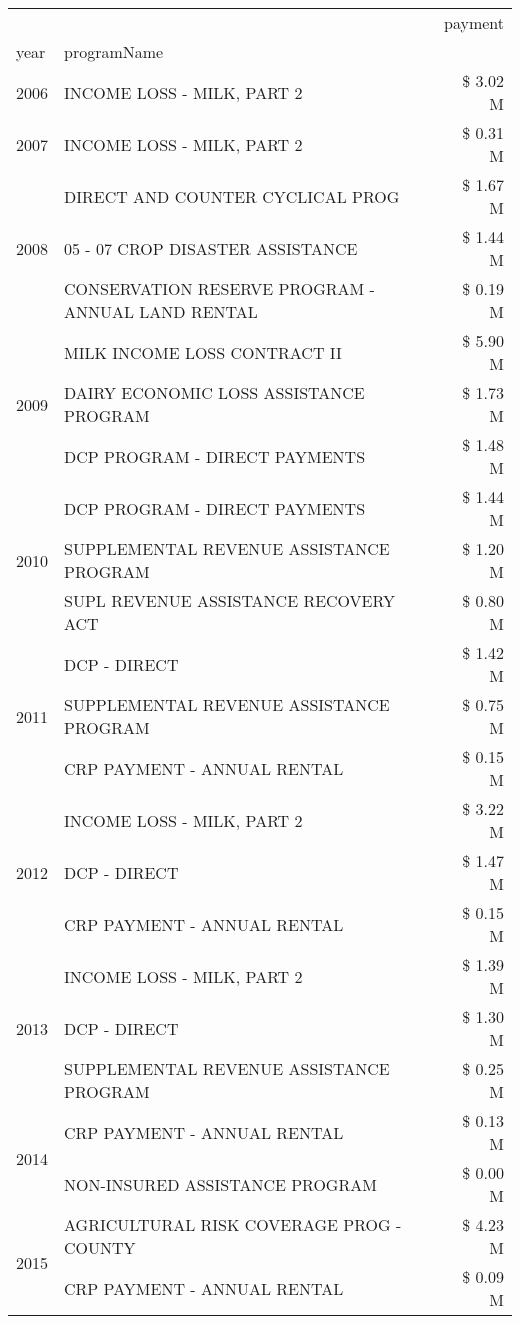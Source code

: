 \begin{tabular}{llr}
\toprule
 &  & payment \\
year & programName &  \\
\midrule
2006 & INCOME LOSS - MILK, PART 2 & \$ 3.02 M \\
\cline{1-3}
2007 & INCOME LOSS - MILK, PART 2 & \$ 0.31 M \\
\cline{1-3}
\multirow[t]{3}{*}{2008} & DIRECT AND COUNTER CYCLICAL PROG & \$ 1.67 M \\
 & 05 - 07 CROP DISASTER ASSISTANCE & \$ 1.44 M \\
 & CONSERVATION RESERVE PROGRAM - ANNUAL LAND RENTAL & \$ 0.19 M \\
\cline{1-3}
\multirow[t]{3}{*}{2009} & MILK INCOME LOSS CONTRACT II & \$ 5.90 M \\
 & DAIRY ECONOMIC LOSS ASSISTANCE PROGRAM & \$ 1.73 M \\
 & DCP PROGRAM - DIRECT PAYMENTS & \$ 1.48 M \\
\cline{1-3}
\multirow[t]{3}{*}{2010} & DCP PROGRAM - DIRECT PAYMENTS & \$ 1.44 M \\
 & SUPPLEMENTAL REVENUE ASSISTANCE PROGRAM & \$ 1.20 M \\
 & SUPL REVENUE ASSISTANCE RECOVERY ACT & \$ 0.80 M \\
\cline{1-3}
\multirow[t]{3}{*}{2011} & DCP - DIRECT & \$ 1.42 M \\
 & SUPPLEMENTAL REVENUE ASSISTANCE PROGRAM & \$ 0.75 M \\
 & CRP PAYMENT - ANNUAL RENTAL & \$ 0.15 M \\
\cline{1-3}
\multirow[t]{3}{*}{2012} & INCOME LOSS - MILK, PART 2 & \$ 3.22 M \\
 & DCP - DIRECT & \$ 1.47 M \\
 & CRP PAYMENT - ANNUAL RENTAL & \$ 0.15 M \\
\cline{1-3}
\multirow[t]{3}{*}{2013} & INCOME LOSS - MILK, PART 2 & \$ 1.39 M \\
 & DCP - DIRECT & \$ 1.30 M \\
 & SUPPLEMENTAL REVENUE ASSISTANCE PROGRAM & \$ 0.25 M \\
\cline{1-3}
\multirow[t]{2}{*}{2014} & CRP PAYMENT - ANNUAL RENTAL & \$ 0.13 M \\
 & NON-INSURED ASSISTANCE PROGRAM & \$ 0.00 M \\
\cline{1-3}
\multirow[t]{3}{*}{2015} & AGRICULTURAL RISK COVERAGE PROG - COUNTY & \$ 4.23 M \\
 & CRP PAYMENT - ANNUAL RENTAL & \$ 0.09 M \\

\end{tabular}
